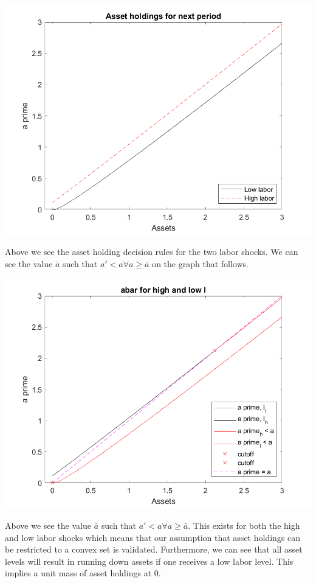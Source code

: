 \documentclass[11pt]{article} %
\begin{document}
\includegraphics{aprime}

Above we see the asset holding decision rules for the two labor shocks. We can see the value $\bar{a}$ such that $a'<a \forall a\geq \bar{a}$ on the graph that follows.

\includegraphics{abar}

Above we see the value $\bar{a}$ such that $a'<a \forall a\geq \bar{a}$. This exists for both the high and low labor shocks which means that our assumption that asset holdings can be restricted to a convex set is validated. Furthermore, we can see that all asset levels will result in running down assets if one receives a low labor level. This implies a unit mass of asset holdings at 0.
\end{document}
